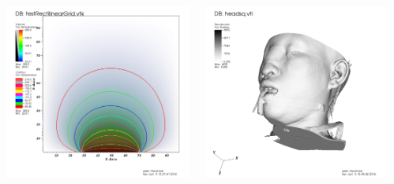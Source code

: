 \begin{frame}
\pause
\vspace{1.35mm}
\begin{columns}
\begin{column}{3cm}
	\includegraphics[width=.9\columnwidth]{figs/visit-handson/testRectilinearGrid}
\end{column}
\begin{column}{3cm}
	\includegraphics[width=.9\columnwidth]{figs/visit-handson/headsq}
\end{column}
\begin{column}{3cm}

\end{column}
\end{columns}
\end{frame}
